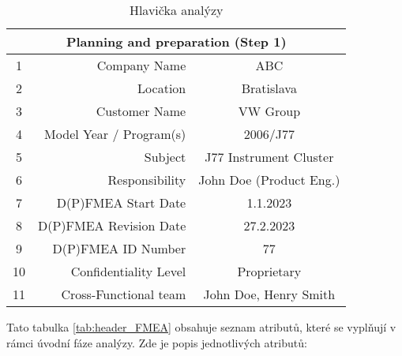 \begin{center}
\begin{table}
	\centering
	\caption{Hlavička analýzy}
 \label{tab:header_FMEA}
	\label{tab:Head1}
        \begin{tabular}{|c | r | c |} 
         \hline
 \multicolumn{3}{|c|}{Planning and preparation (Step 1)} \\

         \hline
         1 & Company Name & ABC  \\ [0.5ex] 
         \hline
         2 & Location & Bratislava  \\ [0.5ex] 
         \hline
         3 & Customer Name & VW Group  \\ [0.5ex] 
         \hline
         4 & Model Year / Program(s) & 2006/J77 \\ [0.5ex] 
         \hline
         5 & Subject & J77 Instrument Cluster \\ [0.5ex] 
         \hline
         6 & Responsibility & John Doe (Product Eng.) \\ [0.5ex] 
         \hline
         7 & D(P)FMEA Start Date & 1.1.2023  \\ [0.5ex] 
         \hline
         8 & D(P)FMEA Revision Date & 27.2.2023 \\ [0.5ex] 
         \hline
         9 & D(P)FMEA ID Number & 77 \\ [0.5ex] 
         \hline
         10 & Confidentiality Level & Proprietary \\ [0.5ex] 
         \hline
         11 & Cross-Functional team & John Doe, Henry Smith \\ [0.5ex] 
         \hline
        \end{tabular}
    \end{table}
\end{center}

Tato tabulka \ref{tab:header_FMEA} obsahuje seznam atributů, které se vyplňují v rámci úvodní fáze analýzy. Zde je popis jednotlivých atributů:

